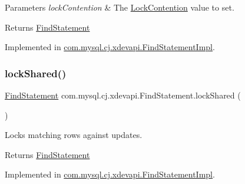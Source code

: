 \begin{DoxyParams}{Parameters}
{\em lock\+Contention} & The \mbox{\hyperlink{}{Lock\+Contention}} value to set. \\
\hline
\end{DoxyParams}
\begin{DoxyReturn}{Returns}
\mbox{\hyperlink{interfacecom_1_1mysql_1_1cj_1_1xdevapi_1_1_find_statement}{Find\+Statement}} 
\end{DoxyReturn}


Implemented in \mbox{\hyperlink{classcom_1_1mysql_1_1cj_1_1xdevapi_1_1_find_statement_impl_abb488a09f4ad595edcb2725712182e38}{com.\+mysql.\+cj.\+xdevapi.\+Find\+Statement\+Impl}}.

\mbox{\label{interfacecom_1_1mysql_1_1cj_1_1xdevapi_1_1_find_statement_aaa2bf84ac564387d2909bf201aa57fc1}} 
\subsubsection{\texorpdfstring{lock\+Shared()}{lockShared()}\hspace{0.1cm}{\footnotesize\ttfamily [1/2]}}
{\footnotesize\ttfamily \mbox{\hyperlink{interfacecom_1_1mysql_1_1cj_1_1xdevapi_1_1_find_statement}{Find\+Statement}} com.\+mysql.\+cj.\+xdevapi.\+Find\+Statement.\+lock\+Shared (\begin{DoxyParamCaption}{ }\end{DoxyParamCaption})}

Locks matching rows against updates.

\begin{DoxyReturn}{Returns}
\mbox{\hyperlink{interfacecom_1_1mysql_1_1cj_1_1xdevapi_1_1_find_statement}{Find\+Statement}} 
\end{DoxyReturn}


Implemented in \mbox{\hyperlink{classcom_1_1mysql_1_1cj_1_1xdevapi_1_1_find_statement_impl_acdc867ddce32e3776d059f72a601fbdd}{com.\+mysql.\+cj.\+xdevapi.\+Find\+Statement\+Impl}}.

\mbox{\label{interfacecom_1_1mysql_1_1cj_1_1xdevapi_1_1_find_statement_a462ecf53c1ba4a9d6e0d29a2a244bd62}} 

